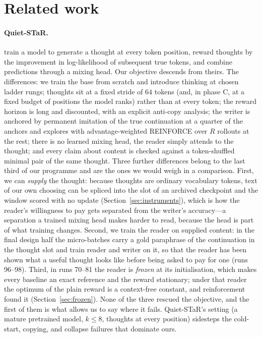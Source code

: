 \documentclass{article} %
\begin{document}
\section{Related work}
\label{sec:related}

\paragraph{Quiet-STaR.} \citet{zelikman2024quietstar} train a model to generate a thought at every token position, reward thoughts by the improvement in log-likelihood of subsequent true tokens, and combine predictions through a mixing head. Our objective descends from theirs. The differences: we train the base from scratch and introduce thinking at chosen ladder rungs; thoughts sit at a fixed stride of $64$ tokens (and, in phase C, at a fixed budget of positions the model ranks) rather than at every token; the reward horizon is long and discounted, with an explicit anti-copy analysis; the writer is anchored by permanent imitation of the true continuation at a quarter of the anchors and explores with advantage-weighted REINFORCE over $R$ rollouts at the rest; there is no learned mixing head, the reader simply attends to the thought; and every claim about content is checked against a token-shuffled minimal pair of the same thought. Three further differences belong to the last third of our programme and are the ones we would weigh in a comparison. First, we can \emph{supply} the thought: because thoughts are ordinary vocabulary tokens, text of our own choosing can be spliced into the slot of an archived checkpoint and the window scored with no update (Section~\ref{sec:instruments}), which is how the reader's willingness to pay gets separated from the writer's accuracy---a separation a trained mixing head makes harder to read, because the head is part of what training changes. Second, we train the reader on supplied content: in the final design half the micro-batches carry a gold paraphrase of the continuation in the thought slot and train reader and writer on it, so that the reader has been shown what a useful thought looks like before being asked to pay for one (runs 96--98). Third, in runs 70--81 the reader is \emph{frozen} at its initialisation, which makes every baseline an exact reference and the reward stationary; under that reader the optimum of the plain reward is a context-free constant, and reinforcement found it (Section~\ref{sec:frozen}). None of the three rescued the objective, and the first of them is what allows us to say where it fails. Quiet-STaR's setting (a mature pretrained model, $k \le 8$, thoughts at every position) sidesteps the cold-start, copying, and collapse failures that dominate ours.
\end{document}
